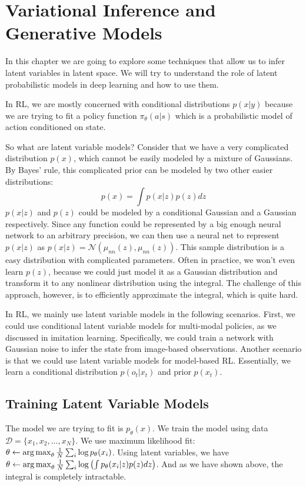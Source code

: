 \chapter{Variational Inference and Generative Models}
In this chapter we are going to explore some techniques that allow us to infer latent variables in latent space. We will try to understand the role of latent probabilistic models in deep learning and how to use them.

In RL, we are mostly concerned with conditional distributions $p(x|y)$ because we are trying to fit a policy function $\pi_\theta(a|s)$ which is a probabilistic model of action conditioned on state. 

So what are latent variable models? Consider that we have a very complicated distribution $p(x)$, which cannot be easily modeled by a mixture of Gaussians. By Bayes' rule, this complicated prior can be modeled by two other easier distributions:
\[
p(x) = \int p(x|z)p(z)dz
\]
$p(x|z)$ and $p(z)$ could be modeled by a conditional Gaussian and a Gaussian respectively. Since any function could be represented by a big enough neural network to an arbitrary precision, we can then use a neural net to represent $p(x|z)$ as $p(x|z) = \mathcal{N}(\mu_{nn}(z),\mu_{nn}(z))$. This sample distribution is a easy distribution with complicated parameters. Often in practice, we won't even learn $p(z)$, because we could just model it as a Gaussian distribution and transform it to any nonlinear distribution using the integral. The challenge of this approach, however, is to efficiently approximate the integral, which is quite hard.

In RL, we mainly use latent variable models in the following scenarios. First, we could use conditional latent variable models for multi-modal policies, as we discussed in imitation learning. Specifically, we could train a network with Gaussian noise to infer the state from image-based observations. Another scenario is that we could use latent variable models for model-based RL. Essentially, we learn a conditional distribution $p(o_t|x_t)$ and prior $p(x_t)$.

\section{Training Latent Variable Models}
The model we are trying to fit is $p_\theta(x)$. We train the model using data $\mathcal{D} = \{x_1,x_2,\dots,x_N\}$. We use maximum likelihood fit: $\theta\leftarrow \operatorname*{arg\,max}_\theta\frac{1}{N}\sum_i\log p_\theta(x_i)$. Using latent variables, we have $\theta\leftarrow \operatorname*{arg\,max}_\theta\frac{1}{N}\sum_i\log \left(\int p_\theta(x_i|z)p(z)dz \right)$. And as we have shown above, the integral is completely intractable. 


